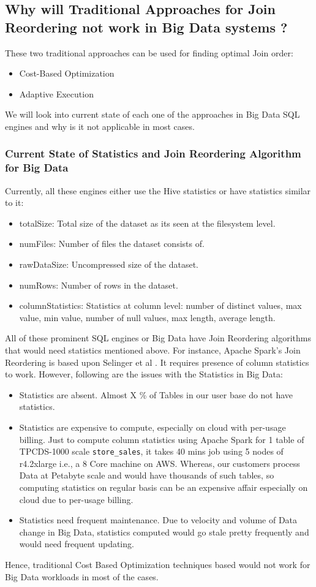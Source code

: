 \subsection{Why will Traditional Approaches for Join Reordering not work in Big Data systems ?}
These two traditional approaches can be used for finding optimal Join order:
\begin{itemize}
\item Cost-Based Optimization
\item Adaptive Execution
\end{itemize}

We will look into current state of each one of the approaches in Big Data SQL engines and why is it not applicable in most cases.

\subsubsection{Current State of Statistics and Join Reordering Algorithm for Big Data}

Currently, all these engines either use the Hive statistics or have statistics similar to it:
\begin{itemize}
\item totalSize: Total size of the dataset as its seen at the filesystem level.
\item numFiles: Number of files the dataset consists of.
\item rawDataSize: Uncompressed size of the dataset.
\item numRows: Number of rows in the dataset.
\item columnStatistics: Statistics at column level: number of distinct values, max value, min value, number of null values, max length, average length.
\end{itemize}

All of these prominent SQL engines or Big Data have Join Reordering algorithms that would need statistics mentioned above. For instance, Apache Spark's Join Reordering is based upon Selinger et al \cite{b1}. It requires presence of column statistics to work. However, following are the issues with the Statistics in Big Data:

\begin{itemize}
\item Statistics are absent. Almost X \% of Tables in our user base do not have statistics.
\item Statistics are expensive to compute, especially on cloud with per-usage billing. Just to compute column statistics using Apache Spark for 1 table of TPCDS-1000 scale \texttt{store\_sales}, it takes 40 mins job using 5 nodes of r4.2xlarge i.e., a 8 Core machine on AWS. Whereas, our customers process Data at Petabyte scale and would have thousands of such tables, so computing statistics on regular basis can be an expensive affair especially on cloud due to per-usage billing.
\item Statistics need frequent maintenance. Due to velocity and volume of Data change in Big Data, statistics computed would go stale pretty frequently and would need frequent updating.
\end{itemize}

Hence, traditional Cost Based Optimization techniques based would not work for Big Data workloads in most of the cases.

